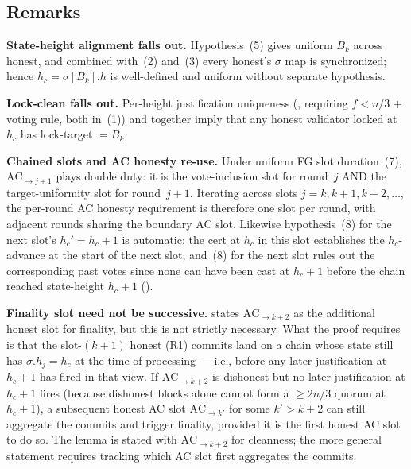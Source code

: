\documentclass{article}
\renewcommand{\paragraph}[1]{\vspace{7pt}\noindent\textbf{#1}}
\theoremstyle{plain}
\theoremstyle{definition}
\theoremstyle{remark}
\begin{document}
\subsection{Remarks}\label{rev:subsec:per-round-remarks}

\paragraph{State-height alignment falls out.} Hypothesis~(5) gives uniform $B_k$ across honest, and combined with~(2) and~(3) every honest's $\sigma$ map is synchronized; hence $h_c = \sigma[B_k].h$ is well-defined and uniform without separate hypothesis.

\paragraph{Lock-clean falls out.} Per-height justification uniqueness (, requiring $f < n/3$ + voting rule, both in~(1)) and  together imply that any honest validator locked at $h_c$ has lock-target $= B_k$.

\paragraph{Chained slots and AC honesty re-use.} Under uniform FG slot duration~(7), $\mathrm{AC}_{\to j+1}$ plays double duty: it is the vote-inclusion slot for round~$j$ AND the target-uniformity slot for round~$j+1$. Iterating across slots $j = k, k+1, k+2, \ldots$, the per-round AC honesty requirement is therefore one slot per round, with adjacent rounds sharing the boundary AC slot. Likewise hypothesis~(8) for the next slot's $h_c' = h_c + 1$ is automatic: the cert at $h_c$ in this slot establishes the $h_c$-advance at the start of the next slot, and~(8) for the next slot rules out the corresponding past votes since none can have been cast at $h_c + 1$ before the chain reached state-height $h_c + 1$ ().

\paragraph{Finality slot need not be successive.}  states $\mathrm{AC}_{\to k+2}$ as the additional honest slot for finality, but this is not strictly necessary. What the proof requires is that the slot-$(k+1)$ honest \mbox{(R1)} commits land on a chain whose state still has $\sigma.h_j = h_c$ at the time of processing --- i.e., before any later justification at $h_c + 1$ has fired in that view. If $\mathrm{AC}_{\to k+2}$ is dishonest but no later justification at $h_c + 1$ fires (because dishonest blocks alone cannot form a $\geq 2n/3$ quorum at $h_c + 1$), a subsequent honest AC slot $\mathrm{AC}_{\to k'}$ for some $k' > k+2$ can still aggregate the commits and trigger finality, provided it is the first honest AC slot to do so. The lemma is stated with $\mathrm{AC}_{\to k+2}$ for cleanness; the more general statement requires tracking which AC slot first aggregates the commits.
\end{document}
